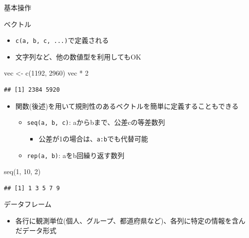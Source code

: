 \documentclass[
  ignorenonframetext,
]{beamer}
\newenvironment{Shaded}{\begin{snugshade}}{\end{snugshade}}
\newcommand{\DecValTok}[1]{\textcolor[rgb]{0.00,0.00,0.81}{#1}}
\newcommand{\FunctionTok}[1]{\textcolor[rgb]{0.00,0.00,0.00}{#1}}
\newcommand{\NormalTok}[1]{#1}
\newcommand{\OtherTok}[1]{\textcolor[rgb]{0.56,0.35,0.01}{#1}}
\newcommand{\SpecialCharTok}[1]{\textcolor[rgb]{0.00,0.00,0.00}{#1}}
\providecommand{\tightlist}{%
  \setlength{\itemsep}{0pt}\setlength{\parskip}{0pt}}
\begin{document}
\begin{frame}[fragile]{基本操作}
\begin{block}{ベクトル}
\begin{itemize}
  \begin{itemize}
  \tightlist
  \item
    \texttt{c(a,\ b,\ c,\ ...)}で定義される
  \item
    文字列など、他の数値型を利用してもOK
  \end{itemize}
\end{itemize}

\begin{Shaded}
\begin{Highlighting}[]
\NormalTok{vec }\OtherTok{\textless{}{-}} \FunctionTok{c}\NormalTok{(}\DecValTok{1192}\NormalTok{, }\DecValTok{2960}\NormalTok{)}
\NormalTok{vec }\SpecialCharTok{*} \DecValTok{2}
\end{Highlighting}
\end{Shaded}

\begin{verbatim}
## [1] 2384 5920
\end{verbatim}

\begin{itemize}
\tightlist
\item
  関数(後述)を用いて規則性のあるベクトルを簡単に定義することもできる

  \begin{itemize}
  \tightlist
  \item
    \texttt{seq(a,\ b,\ c)}: aからbまで、公差cの等差数列

    \begin{itemize}
    \tightlist
    \item
      公差が1の場合は、\texttt{a:b}でも代替可能
    \end{itemize}
  \item
    \texttt{rep(a,\ b)}: aをb回繰り返す数列
  \end{itemize}
\end{itemize}

\begin{Shaded}
\begin{Highlighting}[]
\FunctionTok{seq}\NormalTok{(}\DecValTok{1}\NormalTok{, }\DecValTok{10}\NormalTok{, }\DecValTok{2}\NormalTok{)}
\end{Highlighting}
\end{Shaded}

\begin{verbatim}
## [1] 1 3 5 7 9
\end{verbatim}
\end{block}

\begin{block}{データフレーム}
\protect\hypertarget{ux30c7ux30fcux30bfux30d5ux30ecux30fcux30e0}{}
\begin{itemize}
\item
  各行に観測単位(個人、グループ、都道府県など)、各列に特定の情報を含んだデータ形式


\end{itemize}
\end{block}
\end{frame}
\end{document}
